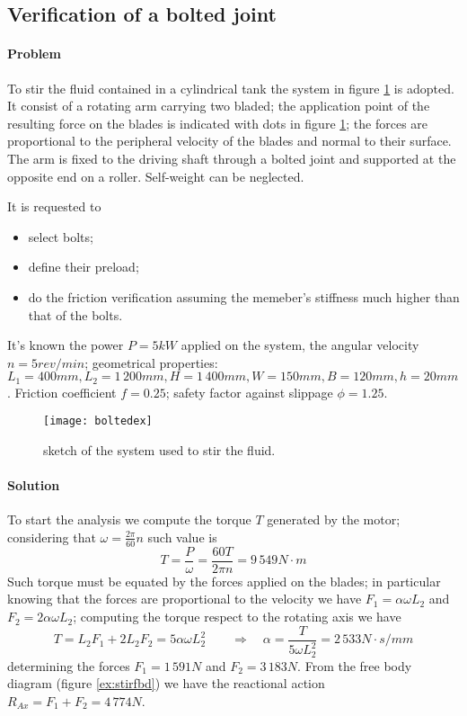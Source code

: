 \newpage
\subsection{Verification of a bolted joint}
	\paragraph{Problem} To stir the fluid contained in a cylindrical tank the system in figure \ref{ex:stirred} is adopted. It consist of a rotating arm carrying two bladed; the application point of the resulting force on the blades is indicated with dots in figure \ref{ex:stirred}; the forces are proportional to the peripheral velocity of the blades and normal to their surface. The arm is fixed to the driving shaft through a bolted joint and supported at the opposite end on a roller. Self-weight can be neglected.
	
	It is requested to
	\begin{itemize}
		\item select bolts; \item define their preload; \item do the friction verification assuming the memeber's stiffness much higher than that of the bolts.
	\end{itemize}
	
	It's known the power $P = 5kW$ applied on the system, the angular velocity $n=5rev/min$; geometrical properties: $L_1 = 400mm, L_2 = 1\,200mm, H =1\,400mm, W=150mm,B=120mm, h=20mm$. Friction coefficient $f=0.25$; safety factor against slippage $\phi= 1.25$.
	
	\begin{figure}[bht]
		\centering \texttt{[image: boltedex]}
		\caption{sketch of the system used to stir the fluid.} \label{ex:stirred}
	\end{figure}
	
	\paragraph{Solution} To start the analysis we compute the torque $T$ generated by the motor; considering that $\omega = \frac {2\pi}{60}n$ such value is
	\[ T = \frac{P}{\omega} = \frac{60T}{2\pi n} =9\,549 N\cdot m  \]
	Such torque must be equated by the forces applied on the blades; in particular knowing that the forces are proportional to the velocity we have $F_1 = \alpha \omega L_2$ and $F_2 = 2\alpha \omega L_2$; computing the torque respect to the rotating axis we have
	\[ T = L_2 F_1 + 2 L_2 F_2 = 5  \alpha \omega L_2^2 \qquad \Rightarrow \quad \alpha = \frac{T}{5\omega L_2^2} = 2\,533 N\cdot s/mm  \]
	determining the forces $F_1 = 1\,591 N$ and $F_2 = 3\,183N$. From the free body diagram (figure \ref{ex:stirfbd}) we have the reactional action $R_{Ax} = F_1 +F_2 = 4\,774N$.
	
